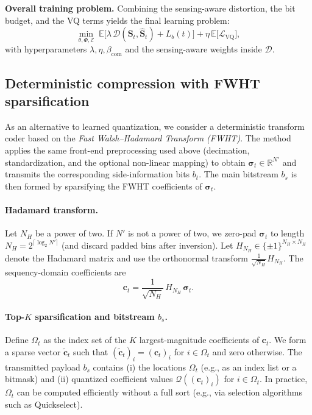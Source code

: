 \documentclass[11pt]{article}
\begin{document}
\vspace{2mm}
\noindent\textbf{Overall training problem.}
Combining the sensing-aware distortion, the bit budget, and the VQ terms yields the final learning problem:
\begin{equation}
\min_{\theta,\Phi,\mathcal{E}} \;
\mathbb{E}\Big[\lambda\,\mathcal{D}(\mathbf{S}_t,\hat{\mathbf{S}}_t) + L_b(t)\Big]
+ \eta\,\mathbb{E}\big[\mathcal{L}_{\mathrm{VQ}}\big],
\end{equation}
with hyperparameters $\lambda,\eta,\beta_{\mathrm{com}}$ and the sensing-aware weights inside $\mathcal{D}$.


\subsection{Deterministic compression with FWHT sparsification}
As an alternative to learned quantization, we consider a deterministic transform coder based on the
\emph{Fast Walsh--Hadamard Transform (FWHT)}. The method applies the same front-end preprocessing used above
(decimation, standardization, and the optional non-linear mapping) to obtain $\bm{\sigma}_t\in\mathbb{R}^{N'}$ and
transmits the corresponding side-information bits $b_t$. The main bitstream $b_s$ is then formed by sparsifying the
FWHT coefficients of $\bm{\sigma}_t$.

\paragraph{Hadamard transform.}
Let $N_H$ be a power of two. If $N'$ is not a power of two, we zero-pad $\bm{\sigma}_t$ to length
$N_H = 2^{\lceil \log_2 N' \rceil}$ (and discard padded bins after inversion). Let $H_{N_H}\in\{\pm1\}^{N_H\times N_H}$
denote the Hadamard matrix and use the orthonormal transform $\frac{1}{\sqrt{N_H}}H_{N_H}$. The sequency-domain
coefficients are
\begin{equation}
\mathbf{c}_t = \frac{1}{\sqrt{N_H}}\,H_{N_H}\,\bm{\sigma}_t.
\end{equation}

\paragraph{Top-$K$ sparsification and bitstream $b_s$.}
Define $\Omega_t$ as the index set of the $K$ largest-magnitude coefficients of $\mathbf{c}_t$.
We form a sparse vector $\tilde{\mathbf{c}}_t$ such that $(\tilde{\mathbf{c}}_t)_i = (\mathbf{c}_t)_i$ for $i\in\Omega_t$
and zero otherwise. The transmitted payload $b_s$ contains (i) the locations $\Omega_t$ (e.g., as an index list or a bitmask)
and (ii) quantized coefficient values $\mathcal{Q}((\mathbf{c}_t)_i)$ for $i\in\Omega_t$.
In practice, $\Omega_t$ can be computed efficiently without a full sort (e.g., via selection algorithms such as Quickselect).
\end{document}
